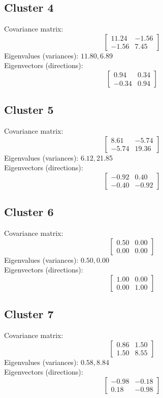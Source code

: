 \documentclass{article}
\begin{document}
\subsection*{Cluster 4}
Covariance matrix:
\[\begin{bmatrix}11.24 & -1.56 \\-1.56 & 7.45\end{bmatrix}\]
Eigenvalues (variances): $ 11.80, $6.89\\
Eigenvectors (directions):
\[\begin{bmatrix}0.94 & 0.34 \\-0.34 & 0.94\end{bmatrix}\]
\subsection*{Cluster 5}
Covariance matrix:
\[\begin{bmatrix}8.61 & -5.74 \\-5.74 & 19.36\end{bmatrix}\]
Eigenvalues (variances): $ 6.12, $21.85\\
Eigenvectors (directions):
\[\begin{bmatrix}-0.92 & 0.40 \\-0.40 & -0.92\end{bmatrix}\]
\subsection*{Cluster 6}
Covariance matrix:
\[\begin{bmatrix}0.50 & 0.00 \\0.00 & 0.00\end{bmatrix}\]
Eigenvalues (variances): $ 0.50, $0.00\\
Eigenvectors (directions):
\[\begin{bmatrix}1.00 & 0.00 \\0.00 & 1.00\end{bmatrix}\]
\subsection*{Cluster 7}
Covariance matrix:
\[\begin{bmatrix}0.86 & 1.50 \\1.50 & 8.55\end{bmatrix}\]
Eigenvalues (variances): $ 0.58, $8.84\\
Eigenvectors (directions):
\[\begin{bmatrix}-0.98 & -0.18 \\0.18 & -0.98\end{bmatrix}\]
\end{document}
